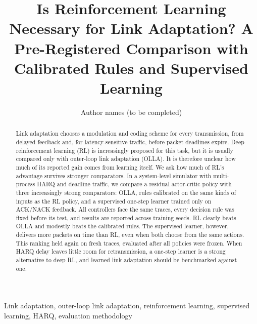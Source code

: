 \documentclass[journal]{IEEEtran}
\begin{document}
\title{Is Reinforcement Learning Necessary for Link Adaptation? A Pre-Registered Comparison with Calibrated Rules and Supervised Learning}
\author{Author names (to be completed)}
\maketitle
\begin{abstract}
Link adaptation chooses a modulation and coding scheme for every transmission, from delayed feedback and, for latency-sensitive traffic, before packet deadlines expire. Deep reinforcement learning (RL) is increasingly proposed for this task, but it is usually compared only with outer-loop link adaptation (OLLA). It is therefore unclear how much of its reported gain comes from learning itself. We ask how much of RL's advantage survives stronger comparators. In a system-level simulator with multi-process HARQ and deadline traffic, we compare a residual actor-critic policy with three increasingly strong comparators: OLLA, rules calibrated on the same kinds of inputs as the RL policy, and a supervised one-step learner trained only on ACK/NACK feedback. All controllers face the same traces, every decision rule was fixed before its test, and results are reported across training seeds. RL clearly beats OLLA and modestly beats the calibrated rules. The supervised learner, however, delivers more packets on time than RL, even when both choose from the same actions. This ranking held again on fresh traces, evaluated after all policies were frozen. When HARQ delay leaves little room for retransmission, a one-step learner is a strong alternative to deep RL, and learned link adaptation should be benchmarked against one.
\end{abstract}
\begin{IEEEkeywords}
Link adaptation, outer-loop link adaptation, reinforcement learning, supervised learning, HARQ, evaluation methodology
\end{IEEEkeywords}











\end{document}
